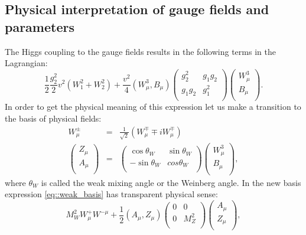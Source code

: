 \subsection{Physical interpretation of gauge fields and parameters}
The Higgs coupling to the gauge fields results in the following terms in the Lagrangian:
\begin{equation}
\label{eq::weak_basis}
\frac{1}{2}\frac{g_2^2}{2}v^2(W_1^2+W^2_2)+\frac{v^2}{4}(W^3_{\mu},B_{\mu}) \begin{pmatrix}
g_2^2  & g_1 g_2 \\
g_1 g_2 & g_1^2   \\
\end{pmatrix}
\begin{pmatrix}
W^3_{\mu} \\
B_{\mu}   \\
\end{pmatrix}.
\end{equation}
In order to get the physical meaning of this expression let us make a transition to the basis of physical fields:
\begin{equation}
\begin{array}{lcl} 
W^{\pm}_{\mu}  &=& \frac{1}{\sqrt{2}}(W^{\mp}_{\mu}\mp iW^{\mp}_{\mu})\\ 
\begin{pmatrix} Z_{\mu} \\ A_{\mu}   \\ \end{pmatrix}  &=& \begin{pmatrix} \cos{\theta_{W}} & \sin{\theta_{W}}\\ -\sin{\theta_{W}}& cos{\theta_{W}}   \\ \end{pmatrix} \begin{pmatrix} W^3_{\mu} \\ B_{\mu}   \\ \end{pmatrix},
\end{array} 
\end{equation}
where $\theta_{W}$ is called the weak mixing angle or the Weinberg angle. In the new basis expression \ref{eq::weak_basis} has transparent physical sense:
\begin{equation}
M^2_W W^+_{\mu}W^{-\mu} +\frac{1}{2} (A_{\mu},Z_{\mu})\begin{pmatrix}
0 & 0 \\
0 & M^2_Z   \\
\end{pmatrix}
\begin{pmatrix}
A_{\mu} \\
Z_{\mu}   \\
\end{pmatrix},
\end{equation}

